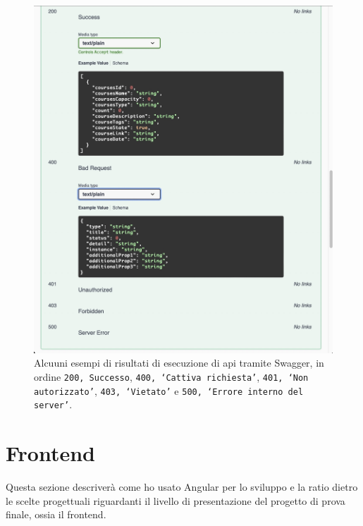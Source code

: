 \begin{figure}[H]
\centering
\includegraphics[width=1\textwidth]{Images/swagger success.jpg}
\caption{\label{fig:swagger success}Alcuuni esempi di risultati di esecuzione di \acrshort{api} tramite Swagger, in ordine \texttt{200, Successo}, \texttt{400, `Cattiva richiesta'}, \texttt{401, `Non autorizzato'}, \texttt{403, `Vietato'} e \texttt{500, `Errore interno del server'}.}
\end{figure}


\newpage
\section{Frontend}\label{sec:frontend}
Questa sezione descriverà come ho usato Angular per lo sviluppo e la ratio dietro le scelte progettuali riguardanti il livello di presentazione del progetto di prova finale, ossia il frontend.\newline

